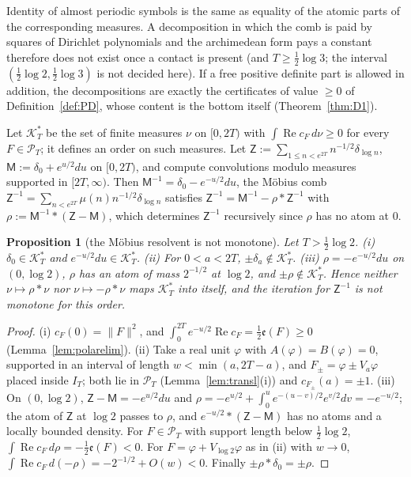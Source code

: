 \documentclass[11pt]{amsart}
\newtheorem{proposition}[theorem]{Proposition}
\theoremstyle{definition}
\theoremstyle{remark}
\newcommand{\Rel}{\operatorname{Re}}
\newcommand{\PT}{\mathcal P_T}
\newcommand{\IT}{I_T}
\newcommand{\cF}{c_F}
\begin{document}
Identity of almost periodic symbols is the same as equality of the atomic parts of the corresponding measures. A
decomposition in which the comb is paid by squares of Dirichlet polynomials and the archimedean form pays a constant
therefore does not exist once a contact is present (and $T\ge\frac12\log3$; the interval $(\frac12\log2,\frac12\log3)$ is not
decided here). If a free positive definite part is allowed in addition, the decompositions are exactly the certificates of
value $\ge0$ of Definition~\ref{def:PD}, whose content is the bottom itself (Theorem~\ref{thm:D1}).

Let $\mathcal K^*_T$ be the set of finite measures $\nu$ on $[0,2T)$ with $\int\Rel\cF\,d\nu\ge0$ for every $F\in\PT$; it
defines an order on such measures. Let $\mathsf Z:=\sum_{1\le n<e^{2T}}n^{-1/2}\delta_{\log n}$, $\mathsf M:=\delta_0+e^{u/2}du$ on $[0,2T)$, and
compute convolutions modulo measures supported in $[2T,\infty)$. Then $\mathsf M^{-1}=\delta_0-e^{-u/2}du$, the M\"obius comb
$\mathsf Z^{-1}=\sum_{n<e^{2T}}\mu(n)n^{-1/2}\delta_{\log n}$ satisfies $\mathsf Z^{-1}=\mathsf M^{-1}-\rho*\mathsf Z^{-1}$ with
$\rho:=\mathsf M^{-1}*(\mathsf Z-\mathsf M)$, which determines $\mathsf Z^{-1}$ recursively since $\rho$ has no atom at $0$.

\begin{proposition}[the M\"obius resolvent is not monotone]\label{prop:cone}
Let $T>\frac12\log2$. \emph{(i)} $\delta_0\in\mathcal K^*_T$ and $e^{-u/2}du\in\mathcal K^*_T$. \emph{(ii)} For $0<a<2T$, $\pm\delta_a\notin\mathcal K^*_T$.
\emph{(iii)} $\rho=-e^{-u/2}du$ on $(0,\log2)$, $\rho$ has an atom of mass $2^{-1/2}$ at $\log2$, and $\pm\rho\notin\mathcal K^*_T$. Hence neither
$\nu\mapsto\rho*\nu$ nor $\nu\mapsto-\rho*\nu$ maps $\mathcal K^*_T$ into itself, and the iteration for $\mathsf Z^{-1}$ is not monotone for this
order.
\end{proposition}

\begin{proof}
(i) $c_F(0)=\|F\|^2$, and $\int_0^{2T}e^{-u/2}\Rel\cF=\frac12\mathfrak e(F)\ge0$ (Lemma~\ref{lem:polarelim}). (ii) Take a real unit $\varphi$ with $A(\varphi)=B(\varphi)=0$,
supported in an interval of length $w<\min(a,2T-a)$, and $F_\pm=\varphi\pm V_a\varphi$ placed inside $\IT$; both lie in $\PT$
(Lemma~\ref{lem:transl}(i)) and $c_{F_\pm}(a)=\pm1$. (iii) On $(0,\log2)$, $\mathsf Z-\mathsf M=-e^{u/2}du$ and
$\rho=-e^{u/2}+\int_0^ue^{-(u-v)/2}e^{v/2}dv=-e^{-u/2}$; the atom of $\mathsf Z$ at $\log2$ passes to $\rho$, and $e^{-u/2}*(\mathsf Z-\mathsf M)$ has no
atoms and a locally bounded density. For $F\in\PT$ with support length below $\frac12\log2$, $\int\Rel\cF\,d\rho=-\frac12\mathfrak e(F)<0$. For
$F=\varphi+V_{\log2}\varphi$ as in (ii) with $w\to0$, $\int\Rel\cF\,d(-\rho)=-2^{-1/2}+O(w)<0$. Finally $\pm\rho*\delta_0=\pm\rho$.
\end{proof}
\end{document}
